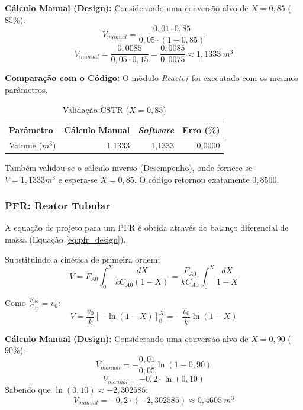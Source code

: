 \textbf{Cálculo Manual (Design):}
Considerando uma conversão alvo de $X = 0,85$ ($85\%$):
\begin{equation}
    V_{manual} = \frac{0,01 \cdot 0,85}{0,05 \cdot (1 - 0,85)}
    \label{eq:val_cstr_vol_calc_1}
\end{equation}
\begin{equation}
    V_{manual} = \frac{0,0085}{0,05 \cdot 0,15} = \frac{0,0085}{0,0075} \approx 1,1333 \ m^3
    \label{eq:val_cstr_vol_calc_2}
\end{equation}

\textbf{Comparação com o Código:}
O módulo \textit{Reactor} foi executado com os mesmos parâmetros.
\begin{table}[H]
    \centering
    \caption{Validação CSTR ($X=0,85$)}
    \begin{tabular}{lrrr}
        \toprule
        \textbf{Parâmetro} & \textbf{Cálculo Manual} & \textbf{\textit{Software}} & \textbf{Erro (\%)} \\
        \midrule
        Volume ($m^3$) & 1,1333 & 1,1333 & 0,0000 \\
        \bottomrule
    \end{tabular}
\end{table}

Também validou-se o cálculo inverso (Desempenho), onde fornece-se $V=1,1333 m^3$ e espera-se $X=0,85$. O código retornou exatamente $0,8500$.

\subsubsection{PFR: Reator Tubular}

A equação de projeto para um PFR é obtida através do balanço diferencial de massa (Equação \ref{eq:pfr_design}).

Substituindo a cinética de primeira ordem:
\begin{equation}
    V = F_{A0} \int_{0}^{X} \frac{dX}{k C_{A0} (1-X)} = \frac{F_{A0}}{k C_{A0}} \int_{0}^{X} \frac{dX}{1-X}
    \label{eq:val_pfr_deriv_1}
\end{equation}

Como $\frac{F_{A0}}{C_{A0}} = v_0$:
\begin{equation}
    V = \frac{v_0}{k} \left[ -\ln(1-X) \right]_{0}^{X} = -\frac{v_0}{k} \ln(1-X)
    \label{eq:val_pfr_deriv_2}
\end{equation}

\textbf{Cálculo Manual (Design):}
Considerando uma conversão alvo de $X = 0,90$ ($90\%$):
\begin{equation}
    V_{manual} = -\frac{0,01}{0,05} \ln(1 - 0,90)
    \label{eq:val_pfr_calc_1}
\end{equation}
\begin{equation}
    V_{manual} = -0,2 \cdot \ln(0,10)
    \label{eq:val_pfr_calc_2}
\end{equation}
Sabendo que $\ln(0,10) \approx -2,302585$:
\begin{equation}
    V_{manual} = -0,2 \cdot (-2,302585) \approx 0,4605 \ m^3
    \label{eq:val_pfr_calc_3}
\end{equation}

